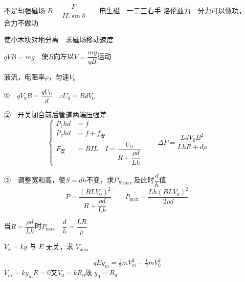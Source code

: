 不是匀强磁场
\noindent $B=\dfrac{F}{IL\sin\theta}$　　电生磁　一二三右手%
\noindent 洛伦兹力　分力可以做功，合力不做功

\begin{problem}
使小木块对地分离　求磁场移动速度
\begin{solution}
$qVB=mg$　使$B$向左以$V=\dfrac{mg}{qB}$运动
\end{solution}
\end{problem}
\begin{problem}
\noindent 液流，电阻率$\rho$，匀速$V_0$

\noindent ①　$qV_0B=\dfrac{qU_0}{d}$　$\therefore U_0=BdV_0$

\noindent ②　开关闭合前后管道两端压强差.
\[ \left\{\begin{aligned}
P_1hd&=f\\
P_2hd&=f+f_{\text{安}}\\
F_{\text{安}}&=BIL\quad I=\dfrac{U_0}{R+\dfrac{\rho d}{Lh}}
\end{aligned}\right.\qquad \Delta P=\dfrac{LdV_0B^2}{LhR+d\rho} \]%

\noindent ③　调整宽和高，使$S=dh$不变，求$P_{R\max}$及此时$\dfrac{d}{h}$值
\[ P=\dfrac{(BLV_0)^2}{R+\dfrac{\rho d}{Lh}}\qquad P_{\max}=\dfrac{Lh(BLV_0)^2}{2\rho d} \]%

\noindent 当$R=\dfrac{\rho d}{Lh}$时$P_{\max}$　$\dfrac{d}{h}=\dfrac{LR}{\rho}$
\end{problem}
$V_x=ky$ 与 $E$ 无关，求 $V_{\max}$

\[ qEy_m=\tfrac12mV_m^2-\tfrac12mV_0^2 \]
$V_m=ky_m$\quad {}$E=0$\quad 又$V_0=kR_0$\quad 故 \quad $y_0=R_0$

